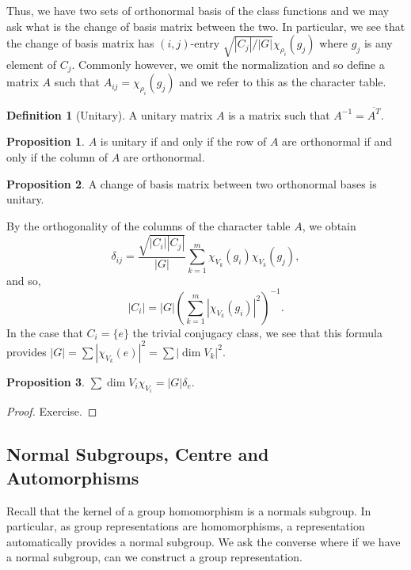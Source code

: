 \documentclass[]{article}
\theoremstyle{definition}
\theoremstyle{definition}
\newtheorem{definition}{Definition}[section]
\newtheorem{proposition}{Proposition}[section]
\begin{document}
Thus, we have two sets of orthonormal basis of the class functions and we may 
ask what is the change of basis matrix between the two. In particular, we 
see that the change of basis matrix has \((i, j)\)-entry 
\(\sqrt{|C_j| / |G|}\chi_{\rho_i}(g_j)\) where \(g_j\) is any element of 
\(C_j\). Commonly however, we omit the normalization and so define 
a matrix \(A\) such that \(A_{ij} = \chi_{\rho_i}(g_j)\) and we refer to this 
as the character table.

\begin{definition}[Unitary]
  A unitary matrix \(A\) is a matrix such that \(A^{-1} = \overline{A^T}\).
\end{definition}

\begin{proposition}
  \(A\) is unitary if and only if the row of \(A\) are orthonormal if and only 
  if the column of \(A\) are orthonormal.
\end{proposition}

\begin{proposition}
  A change of basis matrix between two orthonormal bases is unitary.
\end{proposition}

By the orthogonality of the columns of the character table \(A\), we obtain 
\[\delta_{ij} = \frac{\sqrt{|C_i||C_j|}}{|G|}\sum_{k = 1}^m 
  \chi_{V_k}(g_i)\chi_{V_k}(g_j),\]
and so, 
\[|C_i| = |G| \left(\sum_{k = 1}^m |\chi_{V_k}(g_i)|^2\right)^{-1}.\]
In the case that \(C_i = \{e\}\) the trivial conjugacy class, we see that 
this formula provides \(|G| = \sum |\chi_{V_k}(e)|^2 = \sum |\dim V_k|^2\). 

\begin{proposition}
  \(\sum \dim V_i \chi_{V_i} = |G| \delta_{e}\).
\end{proposition}
\begin{proof}
  Exercise.
\end{proof}

\subsection{Normal Subgroups, Centre and Automorphisms}

Recall that the kernel of a group homomorphism is a normals subgroup. 
In particular, as group representations are homomorphisms, a representation 
automatically provides a normal subgroup. We ask the converse where if 
we have a normal subgroup, can we construct a group representation.
\end{document}
